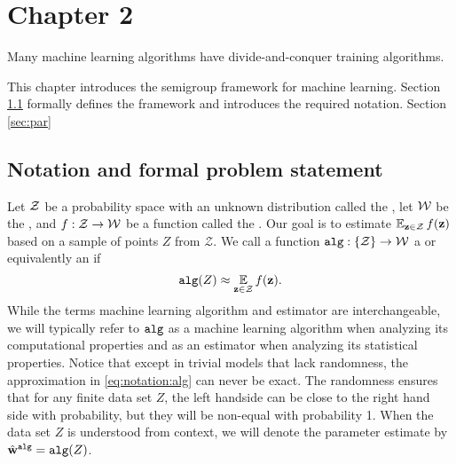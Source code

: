 \documentclass[thesis.tex]{subfiles}
\newcommand{\set}[1]{\mathcal {#1}}
\newcommand{\alg}{\mkprocedure{alg}}
\newcommand{\f}{f}
\newcommand{\walg}{{\hat\w^{\alg}}}
\begin{document}
\chapter{Chapter 2}

Many machine learning algorithms have divide-and-conquer training algorithms.


\noindent


\noindent
This chapter introduces the semigroup framework for machine learning.
Section \ref{sec:notation} formally defines the framework and introduces the required notation.
Section \ref{sec:par}


\section{Notation and formal problem statement}
\label{sec:notation}
Let ${\mathcal Z}$ be a probability space with an unknown distribution called the ,
let ${\mathcal W}$ be the ,
and $\f : \Z \to \W$ be a function called the .
Our goal is to estimate $\E_{\z\in\Z} \f(\z)$ based on a sample of points $Z$ from $\set Z$.
We call a function $\alg : \{\Z\} \to \W$ a  or equivalently an  if
\begin{equation}
    \label{eq:notation:alg}
    \alg(Z) \approx \E_{\z\in\Z}\f(\z)
    .
\end{equation}
While the terms machine learning algorithm and estimator are interchangeable,
we will typically refer to $\alg$ as a machine learning algorithm when analyzing its computational properties
and as an estimator when analyzing its statistical properties.
Notice that except in trivial models that lack randomness, 
the approximation in \eqref{eq:notation:alg} can never be exact.
The randomness ensures that for any finite data set $Z$,
the left handside can be close to the right hand side with probability,
but they will be non-equal with probability 1.
When the data set $Z$ is understood from context,
we will denote the parameter estimate by $\walg=\alg(Z)$.
\end{document}
